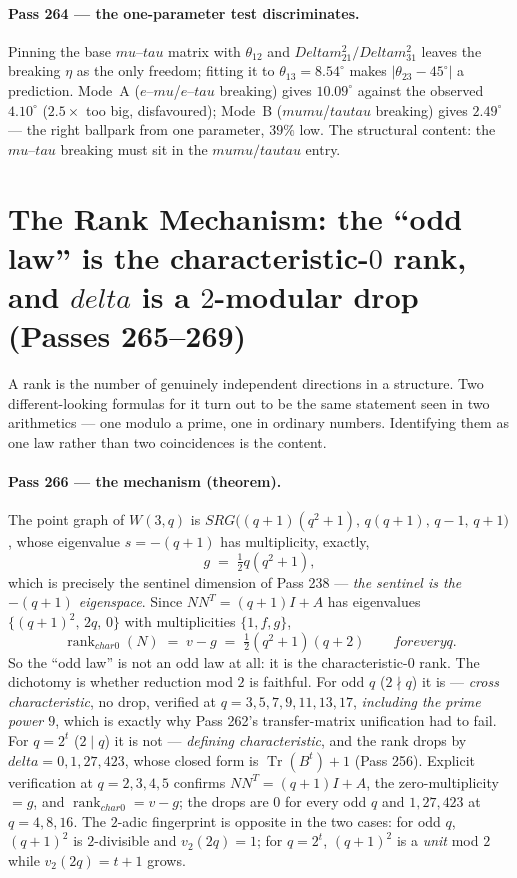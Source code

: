 \documentclass[12pt,a4paper]{article}
\def\mathrm#1{#1}%
\def\textbf#1{#1}%
\def\text#1{#1}%
\def\delta{delta}%
\def\Delta{Delta}%
\def\mu{mu}%
\def\tau{tau}%
\theoremstyle{definition}
\begin{document}
\paragraph{Pass 264 --- the one-parameter test discriminates.} Pinning the base
$\mu$--$\tau$ matrix with $\theta_{12}$ and $\Delta m^2_{21}/\Delta m^2_{31}$
leaves the breaking $\eta$ as the only freedom; fitting it to $\theta_{13}=8.54^\circ$
makes $|\theta_{23}-45^\circ|$ a prediction. Mode~A ($e$--$\mu$/$e$--$\tau$
breaking) gives $10.09^\circ$ against the observed $4.10^\circ$ ($2.5\times$ too
big, disfavoured); Mode~B ($\mu\mu$/$\tau\tau$ breaking) gives $2.49^\circ$ --- the
right ballpark from one parameter, $39\%$ low. The structural content: the
$\mu$--$\tau$ breaking must sit in the $\mu\mu/\tau\tau$ entry.


\section{The Rank Mechanism: the ``odd law'' is the characteristic-$0$ rank, and $\delta$ is a $2$-modular drop (Passes 265--269)}

\begin{plainbox}
A rank is the number of genuinely independent directions in a structure. Two
different-looking formulas for it turn out to be the same statement seen in two arithmetics
--- one modulo a prime, one in ordinary numbers. Identifying them as one law rather than two
coincidences is the content.
\end{plainbox}


\paragraph{Pass 266 --- the mechanism (theorem).} The point graph of $W(3,q)$ is
$\mathrm{SRG}\bigl((q+1)(q^2+1),\,q(q+1),\,q-1,\,q+1\bigr)$, whose eigenvalue
$s=-(q+1)$ has multiplicity, exactly,
\[
   g \;=\; \tfrac12 q(q^2+1),
\]
which is precisely the sentinel dimension of Pass 238 --- \emph{the sentinel is
the $-(q+1)$ eigenspace}. Since $NN^{T}=(q+1)I+A$ has eigenvalues
$\{(q+1)^2,\,2q,\,0\}$ with multiplicities $\{1,f,g\}$,
\[
   \operatorname{rank}_{\text{char }0}(N)\;=\;v-g\;=\;\tfrac12(q^2+1)(q+2)
   \qquad\textbf{for every } q .
\]
So the ``odd law'' is not an odd law at all: it is the characteristic-$0$ rank.
The dichotomy is whether reduction mod $2$ is faithful. For odd $q$ ($2\nmid q$)
it is --- \emph{cross characteristic}, no drop, verified at
$q=3,5,7,9,11,13,17$, \emph{including the prime power $9$}, which is exactly why
Pass 262's transfer-matrix unification had to fail. For $q=2^t$ ($2\mid q$) it is
not --- \emph{defining characteristic}, and the rank drops by
$\delta=0,1,27,423$, whose closed form is $\operatorname{Tr}(B^t)+1$ (Pass 256).
Explicit verification at $q=2,3,4,5$ confirms $NN^T=(q+1)I+A$, the zero-multiplicity
$=g$, and $\operatorname{rank}_{\text{char }0}=v-g$; the drops are $0$ for every
odd $q$ and $1,27,423$ at $q=4,8,16$. The $2$-adic fingerprint is opposite in the
two cases: for odd $q$, $(q+1)^2$ is $2$-divisible and $v_2(2q)=1$; for $q=2^t$,
$(q+1)^2$ is a \emph{unit} mod $2$ while $v_2(2q)=t+1$ grows.
\end{document}
